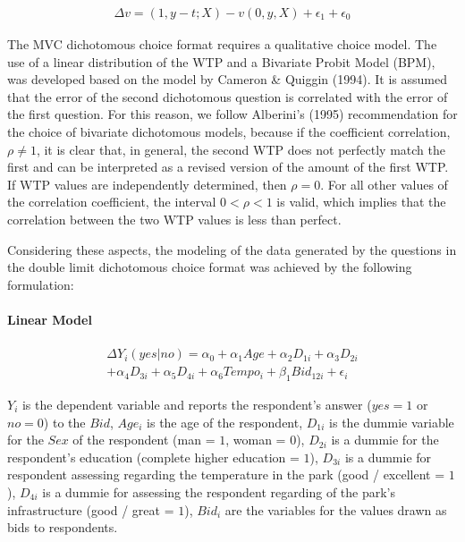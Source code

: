 \documentclass[
]{article}
\begin{document}
\begin{align}
\Delta v= (1, y-t;X) -v(0, y, X) + \epsilon_{1} + \epsilon_{0}  
\end{align}

The MVC dichotomous choice format requires a qualitative choice model.
The use of a linear distribution of the WTP and a Bivariate Probit Model
(BPM), was developed based on the model by Cameron \& Quiggin (1994). It
is assumed that the error of the second dichotomous question is
correlated with the error of the first question. For this reason, we
follow Alberini's (1995) recommendation for the choice of bivariate
dichotomous models, because if the coefficient correlation,
\(\rho \ne 1\), it is clear that, in general, the second WTP does not
perfectly match the first and can be interpreted as a revised version of
the amount of the first WTP. If WTP values are independently determined,
then \(\rho = 0\). For all other values of the correlation coefficient,
the interval \(0 < \rho < 1\) is valid, which implies that the
correlation between the two WTP values is less than perfect.

Considering these aspects, the modeling of the data generated by the
questions in the double limit dichotomous choice format was achieved by
the following formulation:

\hypertarget{linear-model}{%
\paragraph{Linear Model}\label{linear-model}}

\[
\begin{aligned}
\Delta Y_{i}(yes|no)= \alpha_{0} + \alpha_{1}Age + \alpha_{2}D_{1i} + \alpha_{3}D_{2i} \\ 
+ \alpha_{4}D_{3i} + \alpha_{5}D_{4i} + \alpha_{6}Tempo_{i} + \beta_{1}Bid_{12i} + \epsilon_{i}     
\end{aligned}
\]

\(Y_i\) is the dependent variable and reports the respondent's answer
(\(yes = 1\) or \(no = 0\)) to the \(Bid\), \(Age_i\) is the age of the
respondent, \(D_{1i}\) is the dummie variable for the \(Sex\) of the
respondent (man = \(1\), woman = \(0\)), \(D_{2i}\) is a dummie for the
respondent's education (complete higher education = \(1\)), \(D_{3i}\)
is a dummie for respondent assessing regarding the temperature in the
park (good / excellent = \(1\)), \(D_{4i}\) is a dummie for assessing
the respondent regarding of the park's infrastructure (good / great =
\(1\)), \(Bid_i\) are the variables for the values drawn as bids to
respondents.
\end{document}
